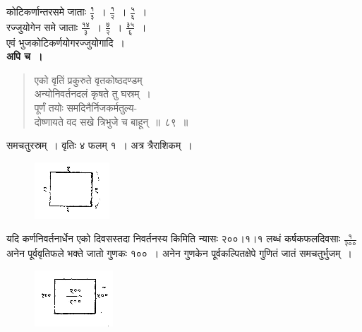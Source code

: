 \documentclass[11pt, openany]{book}
\begin{document}
\vspace{-2mm}
कोटिकर्णान्तरसमे जाताः $\frac{\mbox{१}}{\mbox{३}}$~। $\frac{\mbox{१}}{\mbox{२}}$~। $\frac{\mbox{५}}{\mbox{६}}$~। \\

\vspace{-2mm}
रज्जुयोगेन समे जाताः $\frac{\mbox{१४}}{\mbox{३}}$~। $\frac{\mbox{७}}{\mbox{२}}$~। $\frac{\mbox{३५}}{\mbox{६}}$~। \\

\vspace{-2mm}
एवं भुजकोटिकर्णयोगरज्जुयोगादि~। \\

\vspace{-2mm}
\textbf{अपि च~।} 
\begin{quote}
    \bqt 
    एको वृतिं प्रकुरुते वृतकोष्ठदण्डम्\\
 अन्योनिवर्तनदलं कृषते तु घस्रम्~। \\
पूर्णं तयोः समदिनैर्निजकर्मतुल्य-\\
 दोष्णायते वद सखे त्रिभुजे च बाहून्~॥~८९~॥~
\end{quote}
\newpage

समचतुरस्रम्~। वृतिः ४ फलम् १~। अत्र त्रैराशिकम्~। 
\vspace{-2mm}

\begin{figure}[h!]
     \centering
     \includegraphics[scale=0.85]{graphics/capture143.png}
\end{figure} 
\vspace{-2mm}

 यदि कर्णनिवर्तनार्धेन एको दिवसस्तदा निवर्तनस्य किमिति न्यासः २००।१।१ लब्धं कर्षकफलदिवसाः $\frac{\mbox{१}}{\mbox{२००}}$ अनेन पूर्ववृतिफले भक्ते जातो गुणकः १००~। अनेन गुणकेन पूर्वकल्पितक्षेपे गुणितं जातं समचतुर्भुजम्~। 
\vspace{-2mm}

\begin{figure}[h!]
     \centering
     \includegraphics[scale=0.85]{graphics/capture144.png}
\end{figure} 
\vspace{-2mm}
\end{document}
